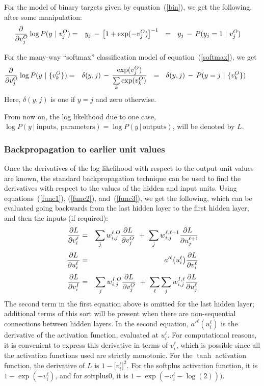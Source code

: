 \documentclass{report}[11pt]
\def\beq{\begin{eqnarray}}
\def\eeq{\end{eqnarray}}
\def\eep{\end{eqnarray}}
\begin{document}
For the model of binary targets given by equation~(\ref{bin}), we
get the following, after some manipulation:\beq
  {\partial \over \partial v^O_j\!}\, \log P(y\ |\ v^O_j) & = &
    y_j\, -\, \big[ 1 + \exp(-v^O_j) \big]^{-1}\ 
    \ =\ \ y_j \,-\, P(y_j=1\ |\ v^O_j)\ \ \ \
\label{bind}\eep

For the many-way ``softmax'' classification model of equation~(\ref{softmax}),
we get\beq
  {\partial \over \partial v^O_j\!}\, \log P(y\ |\ \{v^O_k\}) & = &
    \delta(y,j)\, -\, {\exp(v^O_j) \over \sum\limits_k \exp(v^O_k)}
    \ \ =\ \ \delta(y,j)\, -\, P(y=j\ |\ \{v^O_k\})\ \ \ \ \ \
\label{classd}\eeq%
Here, $\delta(y,j)$ is one if $y=j$ and zero otherwise.  

From now on, the log likelihood due to one case, $\log P(y\ |\
\mbox{inputs},\,\mbox{parameters}) = \log P(y\,|\,\mbox{outputs})$,
will be denoted by $L$.

\subsubsection*{Backpropagation to earlier unit values}

Once the derivatives of the log likelihood with respect to the output
unit values are known, the standard backpropagation technique can be
used to find the derivatives with respect to the values of the hidden
and input units.  Using equations~(\ref{func1}), (\ref{func2}),
and~(\ref{func3}), we get the following, which can be evaluated going
backwards from the last hidden layer to the first hidden layer, and
then the inputs (if required):\beq
  {\partial L \over \partial v^{\ell}_{i\ }\!} & = & 
    \sum_j w^{\ell,O}_{i,j} {\partial L \over \partial v^O_j} \ +\
    \sum_j w^{\ell,\ell+1}_{i,j} {\partial L\ \over \partial u^{\ell+1}_j\! }
    \\[3pt]
  {\partial L \over \partial u^{\ell}_{i\ }\!} & = & 
   a'^{\ell}\big(u^{\ell}_i\big) {\partial L \over \partial v^{\ell}_i } \\[3pt]
  {\partial L \over \partial v^I_{i\ }\!} & = & 
    \sum_j w^{I,O}_{i,j} {\partial L \over \partial v^O_j}\ +\
    \sum_{\ell} \sum_j w^{I,\ell}_{i,j} {\partial L \over \partial u^{\ell}_j }
\eeq%
The second term in the first equation above is omitted for the last
hidden layer; additional terms of this sort will be present when there
are non-sequential connections between hidden layers.  In the second
equation, $a'^{\ell}(u^{\ell}_i)$ is the derivative of the activation
function, evaluated at $u^{\ell}_i$.  For computational reasons, it is
convenient to express this derivative in terms of $v^{\ell}_i$, which is
possible since all the activation functions used are strictly monotonic.
For the $\tanh$ activation function, the derivative of $L$ is $1 -
\big[v^{\ell}_i\big]^2\!$.  For the softplus activation function, it
is $1 - \exp(-v^{\ell}_i)$, and for softplus0, it is $1 -
\exp(-v^{\ell}_i-\log(2)))$.
\end{document}
